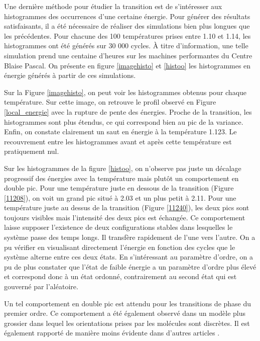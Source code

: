 \documentclass[11pt]{article}
\numberwithin{equation}{section}
\begin{document}
Une dernière méthode pour étudier la transition est de s'intéresser aux histogrammes des occurrences d'une certaine énergie. Pour générer des résultats satisfaisants, il a été nécessaire de réaliser des simulations bien plus longues que les précédentes. Pour chacune des 100 températures prises entre 1.10 et 1.14, les histogrammes ont été générés sur 30 000 cycles. À titre d'information, une telle simulation prend une centaine d'heures sur les machines performantes du Centre Blaise Pascal. On présente en figure \ref{imagehisto} et \ref{histoo} les histogrammes en énergie générés à partir de ces simulations.
\medskip



Sur la Figure \ref{imagehisto}, on peut voir les histogrammes obtenus pour chaque température. Sur cette image, on retrouve le profil observé en Figure \ref{local_energie} avec la rupture de pente des énergies. Proche de la transition, les histogrammes sont plus étendus, ce qui correspond bien au pic de la variance. Enfin, on constate clairement un saut en énergie à la température 1.123. Le recouvrement entre les histogrammes avant et après cette température est pratiquement nul.
\medskip

Sur les histogrammes de la figure \ref{histoo}, on n'observe pas juste un décalage progressif des énergies avec la température mais plutôt un comportement en double pic. Pour une température juste en dessous de la transition (Figure \ref{11208}), on voit un grand pic situé à 2.03 et un plus petit à 2.11. Pour une température juste au dessus de la transition (Figure \ref{11240}), les deux pics sont toujours visibles mais l'intensité des deux pics est échangée. Ce comportement laisse supposer l'existence de deux configurations stables dans lesquelles le système passe des temps longs. Il transfère rapidement de l'une vers l'autre. On a pu vérifier en visualisant directement l'énergie en fonction des cycles que le système alterne entre ces deux états. En s'intéressant au paramètre d'ordre, on a pu de plus constater que l'état de faible énergie a un paramètre d'ordre plus élevé et correspond donc à un état ordonné, contrairement au second état qui est gouverné par l'aléatoire.
\medskip

Un tel comportement en double pic est attendu pour les transitions de phase du premier ordre. Ce comportement a été également observé dans un modèle plus grossier \cite{model} dans lequel les orientations prises par les molécules sont discrètes. Il est également rapporté de manière moins évidente dans d'autres articles \cite{fabbri}.
\vspace{2cm}
\end{document}
